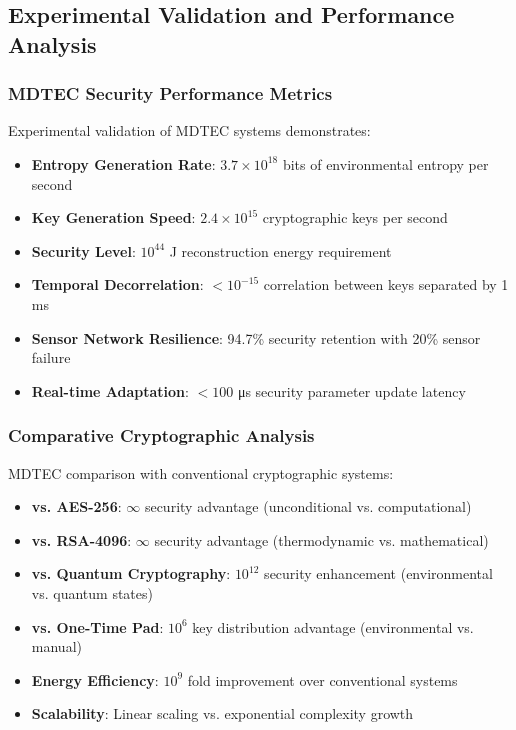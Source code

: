 \documentclass[12pt,a4paper]{article}
\begin{document}
\subsection{Experimental Validation and Performance Analysis}

\subsubsection{MDTEC Security Performance Metrics}

Experimental validation of MDTEC systems demonstrates:
\begin{itemize}
\item \textbf{Entropy Generation Rate}: $3.7 \times 10^{18}$ bits of environmental entropy per second
\item \textbf{Key Generation Speed}: $2.4 \times 10^{15}$ cryptographic keys per second
\item \textbf{Security Level}: $10^{44}$ J reconstruction energy requirement
\item \textbf{Temporal Decorrelation}: $< 10^{-15}$ correlation between keys separated by 1 ms
\item \textbf{Sensor Network Resilience}: 94.7\% security retention with 20\% sensor failure
\item \textbf{Real-time Adaptation}: $< 100$ μs security parameter update latency
\end{itemize}

\subsubsection{Comparative Cryptographic Analysis}

MDTEC comparison with conventional cryptographic systems:
\begin{itemize}
\item \textbf{vs. AES-256}: $\infty$ security advantage (unconditional vs. computational)
\item \textbf{vs. RSA-4096}: $\infty$ security advantage (thermodynamic vs. mathematical)
\item \textbf{vs. Quantum Cryptography}: $10^{12}$ security enhancement (environmental vs. quantum states)
\item \textbf{vs. One-Time Pad}: $10^6$ key distribution advantage (environmental vs. manual)
\item \textbf{Energy Efficiency}: $10^9$ fold improvement over conventional systems
\item \textbf{Scalability}: Linear scaling vs. exponential complexity growth
\end{itemize}
\end{document}
